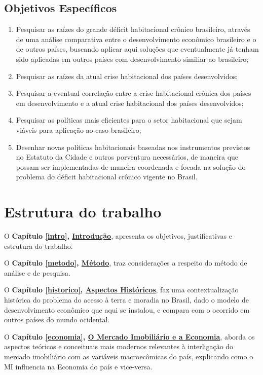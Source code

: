 \documentclass[
	12pt,				%
	oneside,			%
	a4paper,			%
	chapter=TITLE,		%
	section=TITLE,		%
	english,			%
	brazil				%
	]{abntex2}
\begin{document}
\begin{refsection}
{\subsection{Objetivos Específicos}\label{objetivos-especuxedficos}}
\begin{enumerate}
\def\labelenumi{\arabic{enumi}.}
\item
  Pesquisar as raízes do grande déficit habitacional crônico brasileiro,
  através de uma análise comparativa entre o desenvolvimento econômico brasileiro
  e o de outros países, buscando aplicar aqui soluções que eventualmente já tenham
  sido aplicadas em outros países com desenvolvimento similiar ao brasileiro;
\item
  Pesquisar as raízes da atual crise habitacional dos países desenvolvidos;
\item
  Pesquisar a eventual correlação entre a crise habitacional crônica dos
  países em desenvolvimento e a atual crise habitacional dos países desenvolvidos;
\item
  Pesquisar as políticas mais eficientes para o setor habitacional que sejam
  viáveis para aplicação ao caso brasileiro;
\item
  Desenhar novas políticas habitacionais baseadas nos instrumentos previstos no
  Estatuto da Cidade e outros porventura necessários, de maneira que possam ser
  implementadas de maneira coordenada e focada na solução do problema do
  déficit habitacional crônico vigente no Brasil.
\end{enumerate}
\hypertarget{estrutura-do-trabalho}{%
\section{Estrutura do trabalho}\label{estrutura-do-trabalho}}

O \textbf{Capítulo \ref{intro}, \protect\hyperlink{introduuxe7uxe3o-5}{Introdução}}, apresenta os objetivos, justificativas e
estrutura do trabalho.

O \textbf{Capítulo \ref{metodo}, \protect\hyperlink{metodo}{Método}}, traz considerações a respeito do método de análise e
de pesquisa.

O \textbf{Capítulo \ref{historico}, \protect\hyperlink{historico}{Aspectos Históricos}}, faz uma contextualização
histórica do problema do acesso à terra e moradia no Brasil, dado o modelo de
desenvolvimento econômico que aqui se instalou, e compara com o ocorrido em
outros países do mundo ocidental.

O \textbf{Capítulo \ref{economia}, \protect\hyperlink{economia}{O Mercado Imobiliário e a Economia}}, aborda os
aspectos teóricos e conceituais mais modernos relevantes à interligação do
mercado imobiliário com as variáveis macroecômicas do país, explicando como o
\gls{MI} influencia na Economia do país e vice-versa.


\end{refsection}
\end{document}
